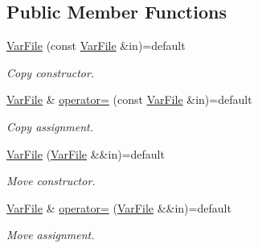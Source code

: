 \subsection*{Public Member Functions}
\begin{DoxyCompactItemize}
\item 
\mbox{\label{classvarfiles_1_1_var_file_ac2bd7600bf42f00f75cfe97963c433be}} 
\hyperlink{classvarfiles_1_1_var_file_ac2bd7600bf42f00f75cfe97963c433be}{Var\+File} (const \hyperlink{classvarfiles_1_1_var_file}{Var\+File} \&in)=default
\begin{DoxyCompactList}\small\item\em Copy constructor. \end{DoxyCompactList}\item 
\mbox{\label{classvarfiles_1_1_var_file_aa0cfdb82cf4acf51c97743aa088f0d03}} 
\hyperlink{classvarfiles_1_1_var_file}{Var\+File} \& \hyperlink{classvarfiles_1_1_var_file_aa0cfdb82cf4acf51c97743aa088f0d03}{operator=} (const \hyperlink{classvarfiles_1_1_var_file}{Var\+File} \&in)=default
\begin{DoxyCompactList}\small\item\em Copy assignment. \end{DoxyCompactList}\item 
\mbox{\label{classvarfiles_1_1_var_file_ab42c36d39e5f33072c8b0679c1fabe60}} 
\hyperlink{classvarfiles_1_1_var_file_ab42c36d39e5f33072c8b0679c1fabe60}{Var\+File} (\hyperlink{classvarfiles_1_1_var_file}{Var\+File} \&\&in)=default
\begin{DoxyCompactList}\small\item\em Move constructor. \end{DoxyCompactList}\item 
\mbox{\label{classvarfiles_1_1_var_file_a33976469a9ee56bb4a73d645b17d44fa}} 
\hyperlink{classvarfiles_1_1_var_file}{Var\+File} \& \hyperlink{classvarfiles_1_1_var_file_a33976469a9ee56bb4a73d645b17d44fa}{operator=} (\hyperlink{classvarfiles_1_1_var_file}{Var\+File} \&\&in)=default
\begin{DoxyCompactList}\small\item\em Move assignment. \end{DoxyCompactList}\item 

\end{DoxyCompactItemize}
